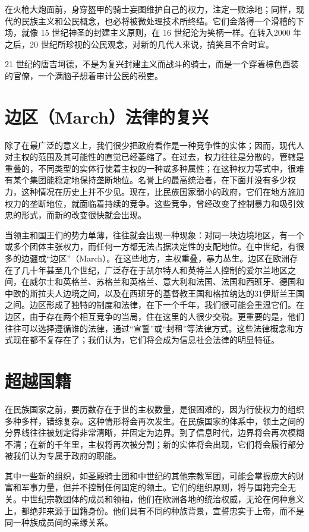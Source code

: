 在火枪大炮面前，身穿盔甲的骑士妄图维护自己的权力，注定一败涂地；同样，现代的民族主义和公民概念，也必将被微处理技术所终结。它们会落得一个滑稽的下场，就像 15 世纪神圣的封建主义原则，在 16 世纪沦为笑柄一样。在转入2000 年之后，20 世纪所珍视的公民观念，对新的几代人来说，搞笑且不合时宜。


21 世纪的唐吉坷德，不是为复兴封建主义而战斗的骑士，而是一个穿着棕色西装的官僚，一个满脑子想着审计公民的税吏。


\section{边区（March）法律的复兴}
除了在最广泛的意义上，我们很少把政府看作是一种竞争性的实体；因而，现代人对主权的范围及其可能性的直觉已经萎缩了。在过去，权力往往是分散的，管辖是重叠的，不同类型的实体行使着主权的一种或多种属性；在这种权力等式中，很难有某个集团能稳定地保持垄断地位。名誉上的最高统治者，在下面并没有多少权力，这种情况在历史上并不少见。现在，比民族国家弱小的政府，它们在地方施加权力的垄断地位，就面临着持续的竞争。这些竞争，曾经改变了控制暴力和吸引效忠的形式，而新的改变很快就会出现。


当领主和国王们的势力单薄，往往就会出现一种现象：对同一块边境地区，有一个或多个团体主张权力，而任何一方都无法占据决定性的支配地位。在中世纪，有很多的边疆或“边区”（March）。在这些地方，主权重叠，暴力丛生。边区在欧洲存在了几十年甚至几个世纪，广泛存在于凯尔特人和英特兰人控制的爱尔兰地区之间，在威尔士和英格兰、苏格兰和英格兰、意大利和法国、法国和西班牙、德国和中欧的斯拉夫人边境之间，以及在西班牙的基督教王国和格拉纳达的31伊斯兰王国之间。边区形成了独特的制度和法律，在下一个千年，我们很可能会重温它们。在边区，由于存在两个相互竞争的当局，住在这里的人很少交税。更重要的是，他们往往可以选择遵循谁的法律，通过“宣誓”或“封租”等法律方式。这些法律概念和方式现在都不复存在了；我们认为，它们将会成为信息社会法律的明显特征。


\section{超越国籍}
在民族国家之前，要历数存在于世的主权数量，是很困难的，因为行使权力的组织多种多样，错综复杂。这种情形将会再次发生。在民族国家的体系中，领土之间的分界线往往被划定得非常清晰，并固定为边界。到了信息时代，边界将会再次模糊不清；在新的千年里，主权将再次被分割；新的实体将会出现，它们将会履行部分被我们认为专属于政府的职能。


其中一些新的组织，如圣殿骑士团和中世纪的其他宗教军团，可能会掌握庞大的财富和军事力量，但并不控制任何固定的领土。它们的组织原则，将与国籍完全无关。中世纪宗教团体的成员和领袖，他们在欧洲各地的统治权威，无论在何种意义上，都绝非来源于国籍身份。他们具有不同的种族背景，宣誓忠实于上帝，而不是同一种族成员间的亲缘关系。


